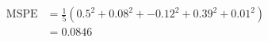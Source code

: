 \begin{align*}
  \text{MSPE} &= \frac{1}{5} \left( 0.5^2 + 0.08^2 + -0.12^2 + 0.39^2 + 0.01^2 \right) \\
  &= 0.0846
\end{align*}